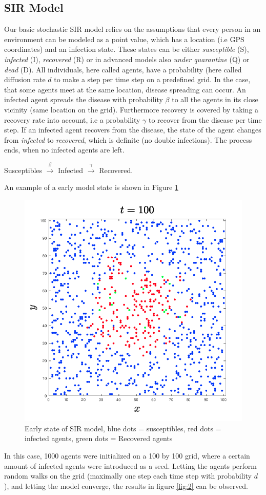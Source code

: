 \documentclass[]{article}
\begin{document}
\subsection{SIR Model}
Our basic stochastic SIR model relies on the assumptions that every person in an environment can be modeled as a point value, which has a location (i.e GPS coordinates) and an infection state. These states can be either \textit{susceptible} (S), \textit{infected} (I), \textit{recovered} (R) or in advanced models also \textit{under quarantine} (Q) or \textit{dead} (D). All individuals, here called agents, have a probability (here called diffusion rate $d$ to make a step per time step on a predefined grid. In the case, that some agents meet at the same location, disease spreading can occur. An infected agent spreads the disease with probability $\beta$ to all the agents in its close vicinity (same location on the grid). Furthermore recovery is covered by taking a recovery rate into account, i.e a probability $\gamma$ to recover from the disease per time step. If an infected agent recovers from the disease, the state of the agent changes from \textit{infected} to \textit{recovered}, which is definite (no double infections). The process ends, when no infected agents are left.
\begin{center}
    Susceptibles $\overset{\beta}{\longrightarrow}$ Infected $\overset{\gamma}{\longrightarrow}$ Recovered.
\end{center}

An example of a early model state is shown in Figure \ref{fig:1}
\begin{figure}[H]
    \centering
    \includegraphics[width=0.4\linewidth]{initial_setup.png}
    \caption{Early state of SIR model, blue dots = susceptibles, red dots = infected agents, green dots = Recovered agents}
    \label{fig:1}
\end{figure}

In this case, 1000 agents were initialized on a 100 by 100 grid, where a certain amount of infected agents were introduced as a seed. Letting the agents perform random walks on the grid (maximally one step each time step with probability $d$), and letting the model converge, the results in figure \ref{fig:2} can be observed.
\end{document}
